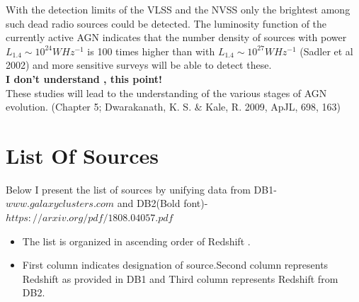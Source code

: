 \documentclass[12pt]{report}
\begin{document}
\begin{itemize}
With the detection limits of the VLSS and the NVSS only the brightest among such dead radio sources could be detected. The luminosity function of the currently active AGN indicates that the number density of sources with power $L_{1.4} \sim 10^{24} W Hz^{-1}$ is 100 times higher than with $L_{1.4} \sim 10^{27} W Hz^{-1}$ (Sadler et al 2002) and more sensitive surveys will be able to detect these.\\
\textbf{I don't understand , this point!}\\

 These studies will
lead to the understanding of the various stages of AGN evolution. (Chapter
5; Dwarakanath, K. S. $\&$ Kale, R. 2009, ApJL, 698, 163)


\end{itemize}
\chapter{List Of Sources}
Below I present the list of sources by unifying data from DB1-$www.galaxyclusters.com$ and DB2(Bold font)-$https://arxiv.org/pdf/1808.04057.pdf
$
\begin{itemize}
\item The list is organized in ascending order of Redshift .\\
\item First column indicates designation of source.Second column represents Redshift as provided in DB1  and Third column represents Redshift from DB2.
\end{itemize}
\end{document}
